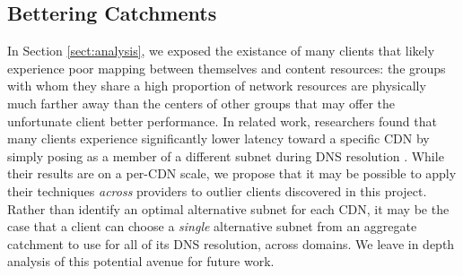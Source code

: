 \subsection{Bettering Catchments}

In Section \ref{sect:analysis}, we exposed the existance of many clients that
likely experience poor mapping between themselves and content resources: the
groups with whom they share a high proportion of network resources are
physically much farther away than the centers of other groups that may offer the
unfortunate client better performance. In related work, researchers found that
many clients experience significantly lower latency toward a specific CDN by
simply posing as a member of a different subnet during DNS resolution \cite{warrior2017drongo}. While their results
are on a per-CDN scale, we propose that it may be possible to apply their
techniques \emph{across} providers to outlier clients discovered in this
project. Rather than identify an optimal alternative subnet for each CDN, it may
be the case that a client can choose a \emph{single} alternative subnet from an
aggregate catchment to use for all of its DNS resolution, across domains. We
leave in depth analysis of this potential avenue for future work.

